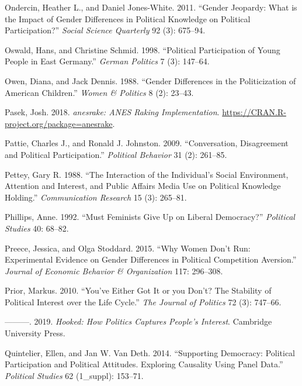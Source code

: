 \documentclass[
  letterpaper,
  DIV=11,
  numbers=noendperiod]{scrreprt}
\newlength{\cslhangindent}
\newlength{\cslentryspacingunit} %
\newenvironment{CSLReferences}[2] %
 {%
  \setlength{\parindent}{0pt}
  \ifodd #1
  \let\oldpar\par
  \def\par{\hangindent=\cslhangindent\oldpar}
  \fi
  \setlength{\parskip}{#2\cslentryspacingunit}
 }%
 {}
\begin{document}
\begin{CSLReferences}{1}{0}
\leavevmode{}%
Ondercin, Heather L., and Daniel Jones-White. 2011. {``{Gender Jeopardy:
What is the Impact of Gender Differences in Political Knowledge on
Political Participation?}''} \emph{Social Science Quarterly} 92 (3):
675--94.

\leavevmode{}%
Oswald, Hans, and Christine Schmid. 1998. {``{Political Participation of
Young People in East Germany}.''} \emph{German Politics} 7 (3): 147--64.

\leavevmode{}%
Owen, Diana, and Jack Dennis. 1988. {``{Gender Differences in the
Politicization of American Children}.''} \emph{Women \& Politics} 8 (2):
23--43.

\leavevmode{}%
Pasek, Josh. 2018. \emph{{anesrake: ANES Raking Implementation}}.
\url{https://CRAN.R-project.org/package=anesrake}.

\leavevmode{}%
Pattie, Charles J., and Ronald J. Johnston. 2009. {``{Conversation,
Disagreement and Political Participation}.''} \emph{Political Behavior}
31 (2): 261--85.

\leavevmode{}%
Pettey, Gary R. 1988. {``{The Interaction of the Individual's Social
Environment, Attention and Interest, and Public Affairs Media Use on
Political Knowledge Holding}.''} \emph{Communication Research} 15 (3):
265--81.

\leavevmode{}%
Phillips, Anne. 1992. {``{Must Feminists Give Up on Liberal
Democracy?}''} \emph{Political Studies} 40: 68--82.

\leavevmode{}%
Preece, Jessica, and Olga Stoddard. 2015. {``{Why Women Don't Run:
Experimental Evidence on Gender Differences in Political Competition
Aversion}.''} \emph{Journal of Economic Behavior \& Organization} 117:
296--308.

\leavevmode{}%
Prior, Markus. 2010. {``{You've Either Got It or you Don't? The
Stability of Political Interest over the Life Cycle}.''} \emph{The
Journal of Politics} 72 (3): 747--66.

\leavevmode{}%
---------. 2019. \emph{{Hooked: How Politics Captures People's
Interest}}. Cambridge University Press.

\leavevmode{}%
Quintelier, Ellen, and Jan W. Van Deth. 2014. {``{Supporting Democracy:
Political Participation and Political Attitudes. Exploring Causality
Using Panel Data}.''} \emph{Political Studies} 62 (1\_suppl): 153--71.


\end{CSLReferences}
\end{document}
